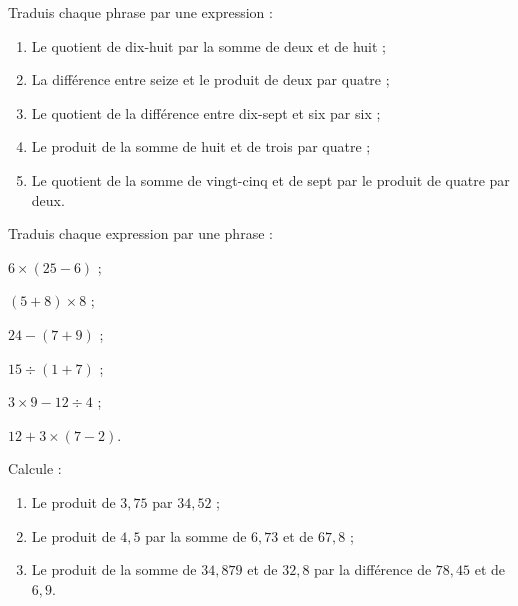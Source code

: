 \begin{exercice}
Traduis chaque phrase par une expression :
\begin{enumerate}
 \item Le quotient de dix-huit par la somme de deux et de huit ;
 \item La différence entre seize et le produit de deux par quatre ;
 \item Le quotient de la différence entre dix-sept et six par six ;
 \item Le produit de la somme de huit et de trois par quatre ;
 \item Le quotient de la somme de vingt-cinq et de sept par le produit de quatre par deux.
 \end{enumerate}
\end{exercice}


\begin{exercice}
Traduis chaque expression par une phrase :
\begin{colenumerate}{2}
 \item $6 \times (25 - 6)$ ;
 \item $(5 + 8) \times 8$ ;
 \item $24 - (7 + 9)$ ;
 \item $15 \div (1 + 7)$ ;
 \item $3 \times 9 - 12 \div 4$ ;
 \item $12 + 3 \times (7 - 2)$.
 \end{colenumerate}
\end{exercice} 


\begin{exercice}
Calcule :
\begin{enumerate}
 \item Le produit de $3,75$ par $34,52$ ;
 \item Le produit de $4,5$ par la somme de $6,73$ et de $67,8$ ;
 \item Le produit de la somme de $34,879$ et de $32,8$ par la différence de $78,45$ et de $6,9$.
 \end{enumerate}
\end{exercice} 





\vspace*{1.2em}




